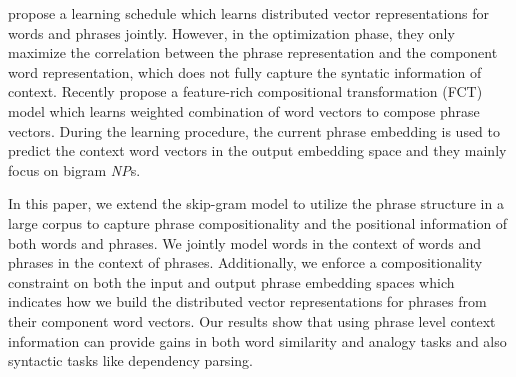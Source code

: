  propose a learning schedule which learns distributed vector representations for words and phrases jointly.
However, in the optimization phase, they only maximize the correlation between the phrase representation and the component word representation, which 
does not fully capture the syntatic information of context. Recently  propose a feature-rich compositional transformation (FCT) model
which learns weighted combination of word vectors to compose phrase vectors. 
During the learning procedure, the current phrase embedding is used to predict the context word
vectors in the output embedding space and they mainly focus on bigram \textit{NP}s.


In this paper, we extend the skip-gram model to utilize the phrase structure in a large corpus to capture phrase compositionality and the positional information
of both words and phrases. We jointly model words in the context of words and
phrases in the context of phrases. Additionally, we enforce a compositionality constraint 
on both the input and output phrase embedding spaces which indicates how
we build the distributed vector representations for phrases from their component word vectors.
Our results show that using phrase level context information can provide gains in both word similarity and analogy tasks and also
syntactic tasks like dependency parsing.
